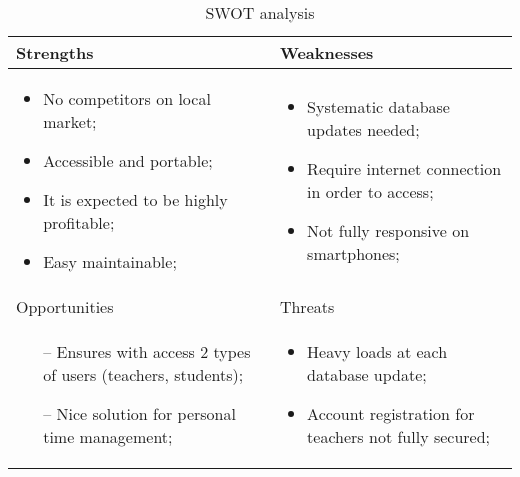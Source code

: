 \begin{table}[H]
\centering
\caption{SWOT analysis}
\begin{tabular}{|l|l|}
\hline
Strengths & Weaknesses
\\ \hline
\begin{minipage}{3.1in}
	\vspace{.5cm}
	\begin{itemize}[leftmargin=*]
	\item No competitors on local market;
	\item Accessible and portable; 
	\item It is expected to be highly profitable;
	\item Easy maintainable;
	\end{itemize}
	\vspace{.5cm}
\end{minipage}
&
\begin{minipage}{3.1in}
	\begin{itemize}[leftmargin=*]
	\item Systematic database updates needed;
	\item Require internet connection in order to access;
	\item Not fully responsive on smartphones;
	\end{itemize}
\end{minipage}

\\ \hline
Opportunities & Threats 
\\ \hline
\begin{minipage}{3.1in}
	\vspace{.5cm}
	\begin{itemize}[leftmargin=*]
	\item[--] Ensures with access 2 types of users (teachers, students);
	\item[--] Nice solution for personal time management;
	\end{itemize}
	\vspace{.5cm}
\end{minipage}
&
\begin{minipage}{3.1in}
	\begin{itemize}[leftmargin=*]
	\item Heavy loads at each database update;
	\item Account registration for teachers not fully secured;
\end{itemize}
\end{minipage}
\\ \hline
\end{tabular}
\label{table:swot}
\end{table}

